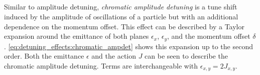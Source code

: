 \subsection{}
\label{subsection:detuning_effects:chromatic_amplitude_detuning}

Similar to amplitude detuning, \textit{chromatic amplitude detuning} is a tune shift induced by the
amplitude of oscillations of a particle but with an additional dependence on the momentum offset.
This effect can be described by a Taylor expansion around the emittance of both planes $\epsilon_x$,
$\epsilon_y$, and the momentum offset $\delta$.
\cref{eq:detuning_effects:chromatic_ampdet} shows this expansion up to the second order. 
Both the emittance $\epsilon$ and the action $J$ can be seen to describe the chromatic amplitude
detuning. Terms are interchangeable with $\epsilon_{x,y} = 2J_{x,y}$.

